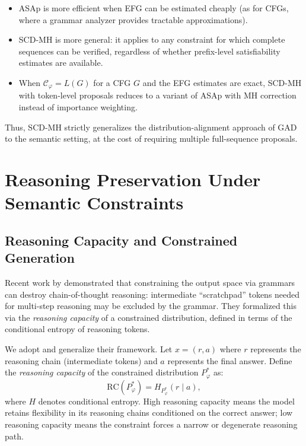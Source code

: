 \documentclass[twoside,11pt]{article}
\newcommand{\Constraint}{\mathcal{C}}
\begin{document}
\begin{itemize}
    \item ASAp is more efficient when EFG can be estimated cheaply (as for
    CFGs, where a grammar analyzer provides tractable approximations).
    \item SCD-MH is more general: it applies to any constraint for which
    complete sequences can be verified, regardless of whether prefix-level
    satisfiability estimates are available.
    \item When $\Constraint_\varphi = L(G)$ for a CFG $G$ and the EFG
    estimates are exact, SCD-MH with token-level proposals reduces to a
    variant of ASAp with MH correction instead of importance weighting.
\end{itemize}

Thus, SCD-MH strictly generalizes the distribution-alignment approach of
GAD to the semantic setting, at the cost of requiring multiple full-sequence
proposals.

\section{Reasoning Preservation Under Semantic Constraints}
\label{sec:reasoning}

\subsection{Reasoning Capacity and Constrained Generation}
\label{sec:reasoning-capacity}

Recent work by \citet{banerjee2025crane} demonstrated that constraining
the output space via grammars can destroy chain-of-thought reasoning:
intermediate ``scratchpad'' tokens needed for multi-step reasoning may be
excluded by the grammar. They formalized this via the \emph{reasoning
capacity} of a constrained distribution, defined in terms of the conditional
entropy of reasoning tokens.

We adopt and generalize their framework. Let $x = (r, a)$ where $r$
represents the reasoning chain (intermediate tokens) and $a$ represents the
final answer. Define the \emph{reasoning capacity} of the constrained
distribution $P^*_\varphi$ as:
\begin{equation}
\label{eq:reasoning-capacity}
\mathrm{RC}(P^*_\varphi) = H_{P^*_\varphi}(r \mid a),
\end{equation}
where $H$ denotes conditional entropy. High reasoning capacity means the
model retains flexibility in its reasoning chains conditioned on the
correct answer; low reasoning capacity means the constraint forces a narrow
or degenerate reasoning path.
\end{document}

